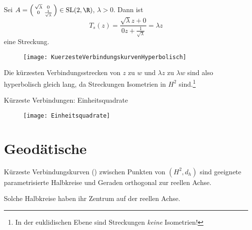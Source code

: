 \begin{remark}
  \
  \begin{enumerate}

    \begin{minipage}{.6\textwidth}
      \item Sei \( A = \left( \begin{smallmatrix}
        \sqrt{\lambda} & 0 \\ 0 & \frac{1}{\sqrt{\lambda}}
      \end{smallmatrix} \right) \in \text{SL}(2,\R) \), \( \lambda > 0 \). Dann ist
      \begin{equation*}
        T_s(z) = \frac{\sqrt{\lambda}z + 0}{0z + \frac{1}{\sqrt{\lambda}}} = \lambda z
      \end{equation*}
      eine Streckung.
      \vspace{1em}
    \end{minipage}
    \hfill
    \begin{minipage}{.375\textwidth}
      \begin{figure}[H]
        \texttt{[image: KuerzesteVerbindungskurvenHyperbolisch]}
      \end{figure}
    \end{minipage}
    Die kürzesten Verbindungsstrecken von \( z \) zu \( w \) und \( \lambda z \) zu \( \lambda w \) sind also hyperbolisch gleich lang, da Streckungen Isometrien in \( H^2 \) sind.\footnote{In der euklidischen Ebene sind Streckungen \emph{keine} Isometrien!}


    \item Kürzeste Verbindungen: Einheitsquadrate
    \begin{figure}[H]
      \texttt{[image: Einheitsquadrate]}
    \end{figure}
  \end{enumerate}
\end{remark}

\section{Geodätische}

\begin{theorem}[Geodätische]
  Kürzeste Verbindungskurven () zwischen Punkten von \( (H^2, d_h) \) sind geeignete parametrisierte Halbkreise und Geraden orthogonal zur reellen Achse.

  Solche Halbkreise haben ihr Zentrum auf der reellen Achse.
\end{theorem}

